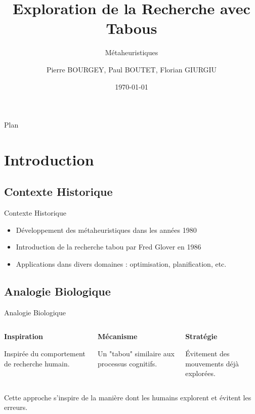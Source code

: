 \documentclass{beamer}
\title{ Exploration de la Recherche avec Tabous}
\subtitle{Métaheuristiques}
\author{Pierre BOURGEY, Paul BOUTET, Florian GIURGIU}
\institute{Télécom Saint-Etienne}
\date{\today}
\begin{document}
\begin{frame}
    \titlepage
\end{frame}

\begin{frame}{Plan}
    \tableofcontents[hideallsubsections]
\end{frame}

\section{Introduction}
\subsection{Contexte Historique}
\begin{frame}{Contexte Historique}
    \begin{itemize}
        \item Développement des métaheuristiques dans les années 1980
        \item Introduction de la recherche tabou par Fred Glover en 1986
        \item Applications dans divers domaines : optimisation, planification, etc.
    \end{itemize}
\end{frame}

\subsection{Analogie Biologique}
\begin{frame}{Analogie Biologique}
    \begin{columns}[T] %
        \begin{column}{0.33\textwidth}
            \textbf{Inspiration}
            \medskip

            Inspirée du comportement de recherche humain. \medskip

        \end{column}
        \begin{column}{0.33\textwidth}

            \textbf{Mécanisme}
            \medskip

            Un "tabou" similaire aux processus cognitifs. \medskip

        \end{column}
        \begin{column}{0.33\textwidth}
            \textbf{Stratégie}
            \medskip

            Évitement des mouvements déjà explorées.
            \medskip

        \end{column}
    \end{columns}
    \bigskip
    Cette approche s'inspire de la manière dont les humains explorent et évitent les erreurs.
\end{frame}
\end{document}
